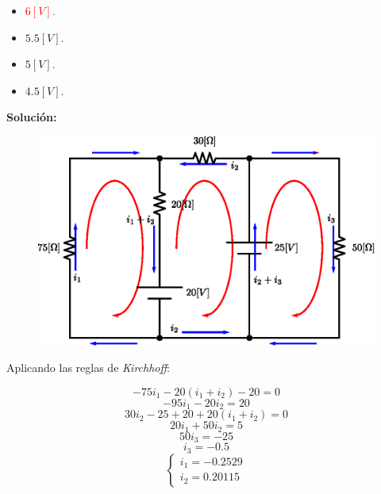 \documentclass[letter,11pt]{article}
\begin{document}
\begin{enumerate}
\begin{itemize}
    \item \textcolor{red}{$6 [V]$.}
    \item $5.5 [V]$.
    \item $5 [V]$.
    \item $4.5 [V]$.
\end{itemize}

\textbf{Solución:}

\begin{figure}[!h]
\centering
\includegraphics[scale=1.00]{resources/a5.eps}
\end{figure}

Aplicando las reglas de \emph{Kirchhoff}:

\begin{equation*}
    -75i_1-20(i_1+i_2)-20=0
\end{equation*}
\begin{equation*}
    -95i_1-20i_2=20
\end{equation*}
\begin{equation*}
    30i_2-25+20+20(i_1+i_2)=0
\end{equation*}
\begin{equation*}
    20i_1+50i_2=5
\end{equation*}
\begin{equation*}
    50i_3 = -25
\end{equation*}
\begin{equation*}
    i_3 = -0.5
\end{equation*}
\begin{equation*}
    \begin{cases}
        i_1 = -0.2529 \\
        i_2 = 0.20115
    \end{cases}
\end{equation*}


\end{enumerate}
\end{document}
